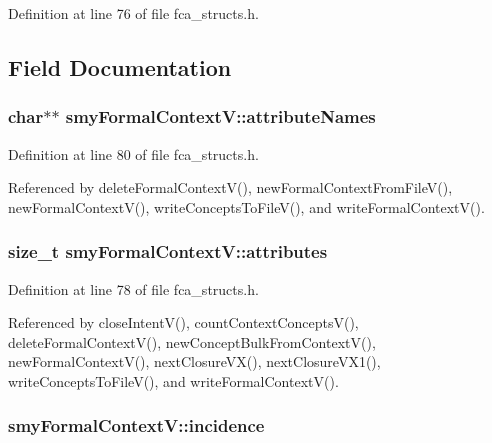 \-Definition at line 76 of file fca\-\_\-structs.\-h.



\subsection{\-Field \-Documentation}
\hypertarget{structsmyFormalContextV_a10705bdd28894f84042e9c1be7f697c6}{
\subsubsection[{attribute\-Names}]{\setlength{\rightskip}{0pt plus 5cm}char$\ast$$\ast$ {\bf smy\-Formal\-Context\-V\-::attribute\-Names}}}\label{structsmyFormalContextV_a10705bdd28894f84042e9c1be7f697c6}


\-Definition at line 80 of file fca\-\_\-structs.\-h.



\-Referenced by delete\-Formal\-Context\-V(), new\-Formal\-Context\-From\-File\-V(), new\-Formal\-Context\-V(), write\-Concepts\-To\-File\-V(), and write\-Formal\-Context\-V().

\hypertarget{structsmyFormalContextV_a94d6bf1233ed7e796e71595d53e85265}{
\subsubsection[{attributes}]{\setlength{\rightskip}{0pt plus 5cm}size\-\_\-t {\bf smy\-Formal\-Context\-V\-::attributes}}}\label{structsmyFormalContextV_a94d6bf1233ed7e796e71595d53e85265}


\-Definition at line 78 of file fca\-\_\-structs.\-h.



\-Referenced by close\-Intent\-V(), count\-Context\-Concepts\-V(), delete\-Formal\-Context\-V(), new\-Concept\-Bulk\-From\-Context\-V(), new\-Formal\-Context\-V(), next\-Closure\-V\-X(), next\-Closure\-V\-X1(), write\-Concepts\-To\-File\-V(), and write\-Formal\-Context\-V().

\hypertarget{structsmyFormalContextV_a1cc9b0c27ade0450dfe33b04c1f767b8}{
\subsubsection[{incidence}]{ {\bf smy\-Formal\-Context\-V\-::incidence}}}\label{structsmyFormalContextV_a1cc9b0c27ade0450dfe33b04c1f767b8}



